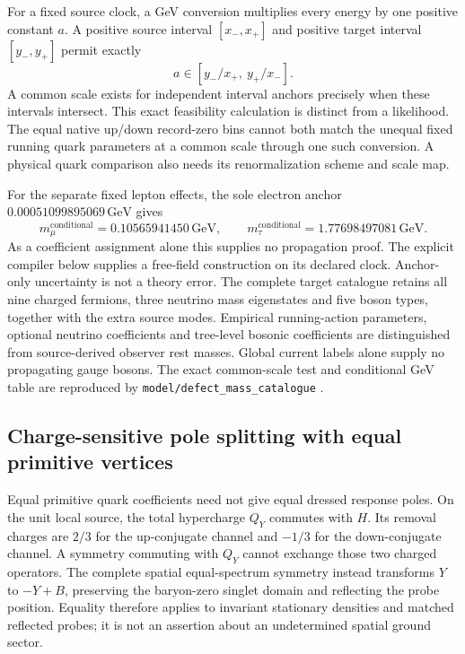 For a fixed source clock, a GeV conversion multiplies every energy by one
positive constant $a$. A positive source interval $[x_-,x_+]$ and positive target
interval $[y_-,y_+]$ permit exactly
\[
 a\in[y_-/x_+,\ y_+/x_-].
\]
A common scale exists for independent interval anchors precisely when
these intervals intersect. This exact feasibility calculation is distinct
from a likelihood. The equal native up/down record-zero bins cannot
both match the unequal fixed running quark parameters at a common scale
through one such conversion. A physical quark comparison also needs its
renormalization scheme and scale map.

For the separate fixed lepton effects, the sole electron anchor
$0.00051099895069\,\mathrm{GeV}$ gives
\[
 m_\mu^{\mathrm{conditional}}=0.10565941450\,\mathrm{GeV},\qquad
 m_\tau^{\mathrm{conditional}}=1.77698497081\,\mathrm{GeV}.
\]
As a coefficient assignment alone this supplies no propagation proof.
The explicit compiler below supplies a free-field construction on its
declared clock. Anchor-only uncertainty is not a theory error. The
complete target catalogue retains all nine charged fermions, three
neutrino mass eigenstates and five boson types, together with the extra
source modes. Empirical running-action parameters, optional neutrino
coefficients and tree-level bosonic coefficients are distinguished from
source-derived observer rest masses. Global current labels alone supply
no propagating gauge bosons. The exact common-scale test and conditional
GeV table are reproduced by \texttt{model/defect\_mass\_catalogue}
\cite{ophrepo}.

\subsection{Charge-sensitive pole splitting with equal primitive vertices}

Equal primitive quark coefficients need not give equal dressed response
poles. On the unit local source, the total hypercharge $Q_Y$ commutes
with $H$. Its removal charges are $2/3$ for the up-conjugate channel and
$-1/3$ for the down-conjugate channel. A symmetry commuting with $Q_Y$
cannot exchange those two charged operators. The complete spatial
equal-spectrum symmetry instead transforms $Y$ to $-Y+B$, preserving
the baryon-zero singlet domain and reflecting the probe position.
Equality therefore applies to invariant stationary densities and matched
reflected probes; it is not an assertion about an undetermined spatial
ground sector.


